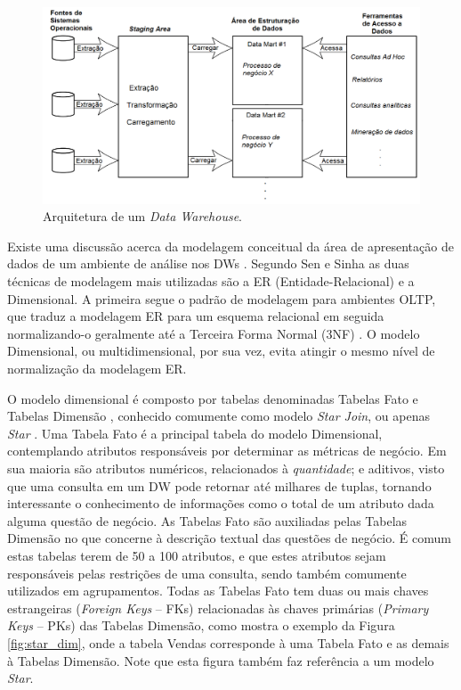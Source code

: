 \begin{figure}[htpb]
	\centering
		\includegraphics[width=\textwidth]{img/dw_arc}
	\caption{Arquitetura de um \textit{Data Warehouse}.}
	\label{fig:dw_arq}
\end{figure}

Existe uma discussão acerca da modelagem conceitual da área de apresentação de dados de um ambiente de análise nos DWs \cite{sen2005comparison}. Segundo Sen e Sinha \cite{sen2005comparison} as duas técnicas de modelagem mais utilizadas são a ER (Entidade-Relacional) e a Dimensional. A primeira segue o padrão de modelagem para ambientes OLTP, que traduz a modelagem ER para um esquema relacional em seguida normalizando-o geralmente até a Terceira Forma Normal (3NF) \cite{kimball2002dw}. O modelo Dimensional, ou multidimensional, por sua vez, evita atingir o mesmo nível de normalização da modelagem ER. 

O modelo dimensional é composto por tabelas denominadas Tabelas Fato e Tabelas Dimensão \cite{kimball2002dw}, conhecido comumente como modelo \textit{Star Join}, ou apenas \textit{Star} \cite{sen2005comparison}. Uma Tabela Fato é a principal tabela do modelo Dimensional, contemplando atributos responsáveis por determinar as métricas de negócio. Em sua maioria são atributos numéricos, relacionados à \textit{quantidade}; e aditivos, visto que uma consulta em um DW pode retornar até milhares de tuplas, tornando interessante o conhecimento de informações como o total de um atributo dada alguma questão de negócio. As Tabelas Fato são auxiliadas pelas Tabelas Dimensão no que concerne à descrição textual das questões de negócio. É comum estas tabelas terem de 50 a 100 atributos, e que estes atributos sejam responsáveis pelas restrições de uma consulta, sendo também comumente utilizados em agrupamentos. Todas as Tabelas Fato tem duas ou mais chaves estrangeiras (\textit{Foreign Keys} -- FKs) relacionadas às chaves primárias (\textit{Primary Keys} -- PKs) das Tabelas Dimensão, como mostra o exemplo da Figura \ref{fig:star_dim}, onde a tabela Vendas corresponde à uma Tabela Fato e as demais à Tabelas Dimensão. Note que esta figura também faz referência a um modelo \textit{Star}.

